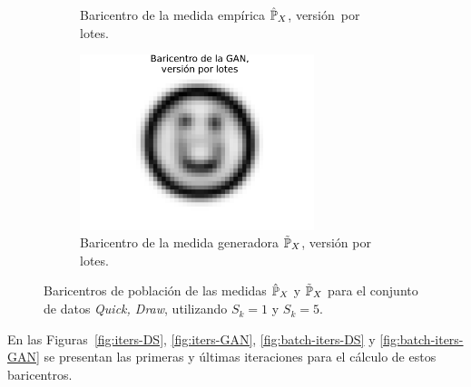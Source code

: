 \begin{figure}[htbp]
\begin{subfigure}[b]{0.45\textwidth}
        \caption{Baricentro de la medida empírica $\hat\Prob_X$, versión~por lotes.}
        \label{fig:batch-bar-DS}
    \end{subfigure}
    \hfill
    \begin{subfigure}[b]{0.45\textwidth}
        \centering
        \includegraphics[width=0.75\textwidth]{img/barycenters/batch-bar-GAN.pdf}
        \caption{Baricentro de la medida generadora $\tilde\Prob_X$, versión por lotes.}
        \label{fig:batch-bar-GAN}
    \end{subfigure}
    \caption{Baricentros de población de las medidas $\hat\Prob_X$ y $\tilde\Prob_X$ para el conjunto de datos \textit{Quick, Draw}, utilizando $S_k=1$ y $S_k=5$.}
    \label{fig:barycenters}
\end{figure}

En las Figuras~\ref{fig:iters-DS}, \ref{fig:iters-GAN}, \ref{fig:batch-iters-DS} y \ref{fig:batch-iters-GAN} se presentan las primeras y últimas iteraciones para el cálculo de estos baricentros.


